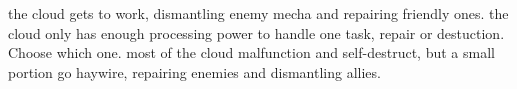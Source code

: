 {the cloud gets to work, dismantling enemy mecha and repairing friendly ones.}
{the cloud only has enough processing power to handle one task, repair or destuction. Choose which one.}
{most of the cloud malfunction and self-destruct, but a small portion go haywire, repairing enemies and dismantling allies.}

